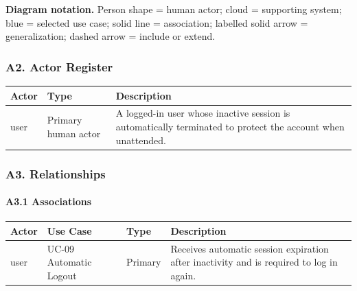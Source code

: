 \documentclass[12pt]{article}
\renewcommand{\baselinestretch}{1.5}
\begin{document}
\textbf{Diagram notation.} Person shape = human actor; cloud = supporting system; blue = selected use case; solid line = association; labelled solid arrow = generalization; dashed arrow = include or extend.
\par\medskip

\hypertarget{sec:a2-actor-register}{}
\subsubsection*{A2. Actor Register}
\par\medskip

\begingroup
\small
\renewcommand{\baselinestretch}{1.0}\selectfont
\renewcommand{\arraystretch}{1.15}
\setlength{\tabcolsep}{6pt}
\begin{longtable}{|>{\raggedright\arraybackslash}p{}|>{\raggedright\arraybackslash}p{}|>{\raggedright\arraybackslash}p{}|}
\hline
\textbf{Actor} & \textbf{Type} & \textbf{Description} \\ \hline
\endhead
user & Primary human actor & A logged-in user whose inactive session is automatically terminated to protect the account when unattended. \\ \hline
\end{longtable}
\endgroup
\par\medskip

\hypertarget{sec:a3-relationships}{}
\subsubsection*{A3. Relationships}
\par\medskip

\hypertarget{sec:a3-1-associations}{}
\paragraph*{A3.1 Associations}
\par\medskip

\begingroup
\small
\renewcommand{\baselinestretch}{1.0}\selectfont
\renewcommand{\arraystretch}{1.15}
\setlength{\tabcolsep}{6pt}
\begin{longtable}{|>{\raggedright\arraybackslash}p{}|>{\raggedright\arraybackslash}p{}|>{\raggedright\arraybackslash}p{}|>{\raggedright\arraybackslash}p{}|}
\hline
\textbf{Actor} & \textbf{Use Case} & \textbf{Type} & \textbf{Description} \\ \hline
\endhead
user & UC-09 Automatic Logout & Primary & Receives automatic session expiration after inactivity and is required to log in again. \\ \hline
\end{longtable}
\endgroup
\par\medskip
\end{document}
